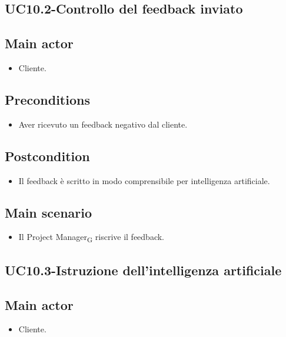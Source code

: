 \documentclass{article}
\begin{document}
\subsection{UC10.2-Controllo del feedback inviato}
    
     \subsection*{Main actor}
         \begin{itemize}
             \item Cliente.
         \end{itemize}
     \subsection*{Preconditions} 
        \begin{itemize}
            \item Aver ricevuto un feedback negativo dal cliente.
        \end{itemize}
        \subsection*{Postcondition} 
        \begin{itemize}
            \item Il feedback è scritto in modo comprensibile per intelligenza artificiale.
        \end{itemize}
        \subsection*{Main scenario}
        \begin{itemize}
            \item Il Project Manager\textsubscript{G} riscrive il feedback.
        \end{itemize}

    \subsection{UC10.3-Istruzione dell'intelligenza artificiale}
     \subsection*{Main actor}
         \begin{itemize}
             \item Cliente.
         \end{itemize}
\end{document}
